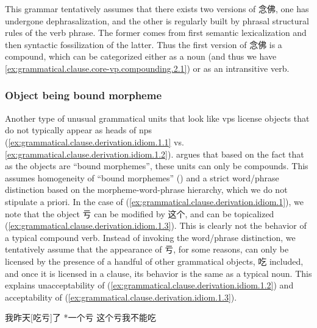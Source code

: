 \documentclass[UTF8, a4paper, oneside, scheme=plain, 12pt]{ctexrep}
\newcommand*{\citepage}[1]{p.~{#1}}
\begin{document}
This grammar tentatively assumes that there exists two versions of 念佛,
one has undergone dephrasalization, 
and the other is regularly built by phrasal structural rules of the verb phrase.
The former comes from first semantic lexicalization and then syntactic fossilization of the latter.
Thus the first version of 念佛 is a compound,
which can be categorized either as a noun (and thus we have \ref{ex:grammatical.clause.core-vp.compounding.2.1}) or as an intransitive verb.

\subsubsection{Object being bound morpheme}\label{sec:grammatical.clause.core-vp.derivation.object-bound}

Another type of unusual grammatical units that look like \acp{vp} 
license objects that do not typically appear as heads of \acp{np}
(\ref{ex:grammatical.clause.derivation.idiom.1.1} vs. \ref{ex:grammatical.clause.derivation.idiom.1.2}).
\citet[\citepage{129}]{zhudexigrammar} argues that based on the fact that 
as the objects are ``bound morphemes'', these units can only be compounds.
This assumes homogeneity of ``bound morphemes'' ()
and a strict word/phrase distinction based on the morpheme-word-phrase hierarchy,
which we do not stipulate a priori.
In the case of (\ref{ex:grammatical.clause.derivation.idiom.1}),
we note that the object 亏 can be modified by 这个,
and can be topicalized (\ref{ex:grammatical.clause.derivation.idiom.1.3}).
This is clearly not the behavior of a typical compound verb.
Instead of invoking the word/phrase distinction,
we tentatively assume that the appearance of 亏,
for some reasons, can only be licensed by the presence of a handful of other grammatical objects,
吃 included, and once it is licensed in a clause,
its behavior is the same as a typical noun.
This explains unacceptability of (\ref{ex:grammatical.clause.derivation.idiom.1.2})
and acceptability of (\ref{ex:grammatical.clause.derivation.idiom.1.3}).

\begin{exe}
    \ex\label{ex:grammatical.clause.derivation.idiom.1} \begin{xlist}
        \ex\label{ex:grammatical.clause.derivation.idiom.1.1} 我昨天[吃亏]了
        \ex\label{ex:grammatical.clause.derivation.idiom.1.2} *一个亏
        \ex\label{ex:grammatical.clause.derivation.idiom.1.3} 这个亏我不能吃
    \end{xlist}
\end{exe}
\end{document}
